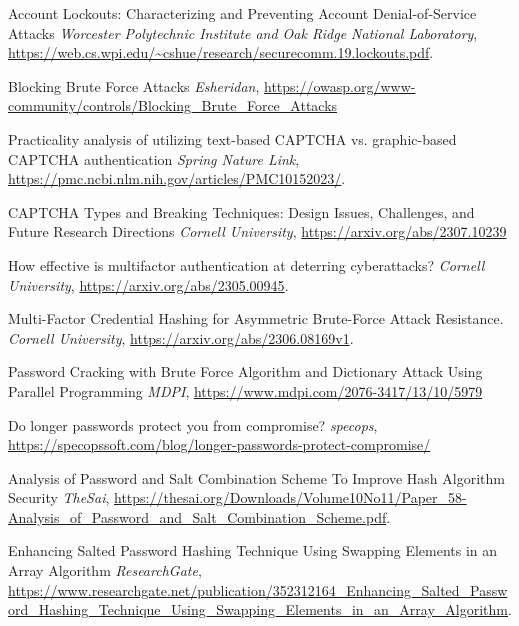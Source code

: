 \documentclass{comjnl}
\begin{document}
\begin{thebibliography}{99}

   Account Lockouts: Characterizing and Preventing Account Denial-of-Service Attacks
  \textit{Worcester Polytechnic Institute and Oak Ridge National Laboratory}, \url{https://web.cs.wpi.edu/~cshue/research/securecomm.19.lockouts.pdf}.

   Blocking Brute Force Attacks
  \textit{Esheridan}, \url{https://owasp.org/www-community/controls/Blocking_Brute_Force_Attacks}


   Practicality analysis of utilizing text-based CAPTCHA vs. graphic-based CAPTCHA authentication
  \textit{Spring Nature Link}, \url{https://pmc.ncbi.nlm.nih.gov/articles/PMC10152023/}.

   CAPTCHA Types and Breaking Techniques: Design Issues, Challenges, and Future Research Directions
  \textit{Cornell University}, \url{https://arxiv.org/abs/2307.10239}
  

   How effective is multifactor authentication at deterring cyberattacks? 
  \textit{Cornell University}, \url{https://arxiv.org/abs/2305.00945}.
  
   Multi-Factor Credential Hashing for Asymmetric Brute-Force Attack Resistance.
  \textit{Cornell University}, \url{https://arxiv.org/abs/2306.08169v1}.

   Password Cracking with Brute Force Algorithm and Dictionary Attack Using Parallel Programming
  \textit{MDPI}, \url {https://www.mdpi.com/2076-3417/13/10/5979}

   Do longer passwords protect you from compromise?
  \textit{specops}, \url {https://specopssoft.com/blog/longer-passwords-protect-compromise/}

   Analysis of Password and Salt Combination Scheme To Improve Hash Algorithm Security
  \textit{TheSai}, \url{https://thesai.org/Downloads/Volume10No11/Paper_58-Analysis_of_Password_and_Salt_Combination_Scheme.pdf}.

   Enhancing Salted Password Hashing Technique Using Swapping Elements in an Array Algorithm
  \textit{ResearchGate}, \url{https://www.researchgate.net/publication/352312164_Enhancing_Salted_Password_Hashing_Technique_Using_Swapping_Elements_in_an_Array_Algorithm}.
  
\end{thebibliography}




\end{document}
